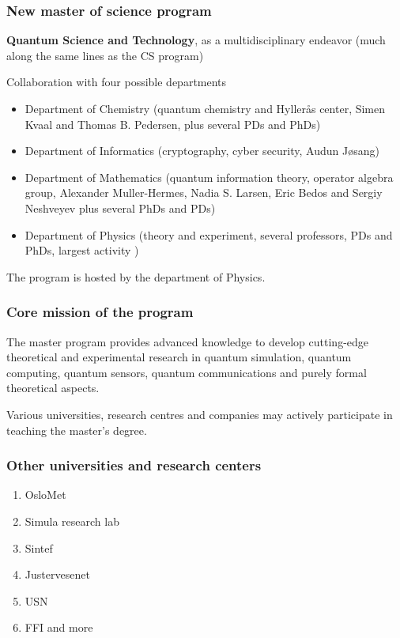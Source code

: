 \documentclass{beamer}
\begin{document}
\begin{frame}
\frametitle{New master of science program}

\textbf{Quantum Science and Technology}, as a multidisciplinary endeavor (much along the same lines as the CS program)
\begin{block}{Collaboration with four possible departments  }
\begin{itemize}
 \item Department of Chemistry (quantum chemistry and Hyllerås center, Simen Kvaal and Thomas B. Pedersen, plus several PDs and PhDs)

 \item Department of Informatics (cryptography, cyber security, Audun Jøsang)

 \item Department of Mathematics (quantum information theory, operator algebra group, Alexander Muller-Hermes, Nadia S. Larsen, Eric Bedos and Sergiy Neshveyev plus several PhDs and PDs)

 \item Department of Physics (theory and experiment, several professors, PDs and PhDs, largest activity )
\end{itemize}

\noindent
\end{block}
The program is hosted by the department of Physics.
\end{frame}

\begin{frame}
\frametitle{Core mission of the program}

The master program provides advanced knowledge to develop
cutting-edge theoretical and experimental research in quantum
simulation, quantum computing, quantum sensors, quantum communications
and purely formal theoretical aspects.

Various universities, research centres and companies may actively
participate in teaching the master's degree.
\end{frame}

\begin{frame}
\frametitle{Other universities and research centers}

\begin{enumerate}
\item OsloMet

\item Simula research lab

\item Sintef

\item Justervesenet

\item USN

\item FFI and more
\end{enumerate}

\noindent
\end{frame}
\end{document}
